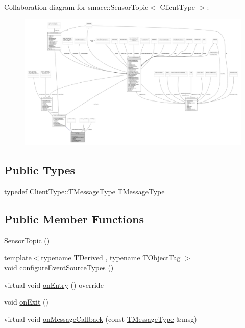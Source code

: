 Collaboration diagram for smacc\+:\+:Sensor\+Topic$<$ Client\+Type $>$\+:
\nopagebreak
\begin{figure}[H]
\begin{center}
\leavevmode
\includegraphics[width=350pt]{classsmacc_1_1SensorTopic__coll__graph}
\end{center}
\end{figure}
\subsection*{Public Types}
\begin{DoxyCompactItemize}
\item 
typedef Client\+Type\+::\+T\+Message\+Type \hyperlink{classsmacc_1_1SensorTopic_a8c57644ed5865162ef19fd5a290d2730}{T\+Message\+Type}
\end{DoxyCompactItemize}
\subsection*{Public Member Functions}
\begin{DoxyCompactItemize}
\item 
\hyperlink{classsmacc_1_1SensorTopic_a3c11e8c6e738cea40c8172b033533bab}{Sensor\+Topic} ()
\item 
{\footnotesize template$<$typename T\+Derived , typename T\+Object\+Tag $>$ }\\void \hyperlink{classsmacc_1_1SensorTopic_a642f1ced7db66cd92a2ec43e128b4fd1}{configure\+Event\+Source\+Types} ()
\item 
virtual void \hyperlink{classsmacc_1_1SensorTopic_aa18961f866b7427973acb2660c8e39ee}{on\+Entry} () override
\item 
void \hyperlink{classsmacc_1_1SensorTopic_a3d667ad8340bd04a8a6b84eccfebe3f0}{on\+Exit} ()
\item 
virtual void \hyperlink{classsmacc_1_1SensorTopic_ab28b08e1dc643d880ce016f41c60b7b6}{on\+Message\+Callback} (const \hyperlink{classsmacc_1_1SensorTopic_a8c57644ed5865162ef19fd5a290d2730}{T\+Message\+Type} \&msg)
\end{DoxyCompactItemize}
